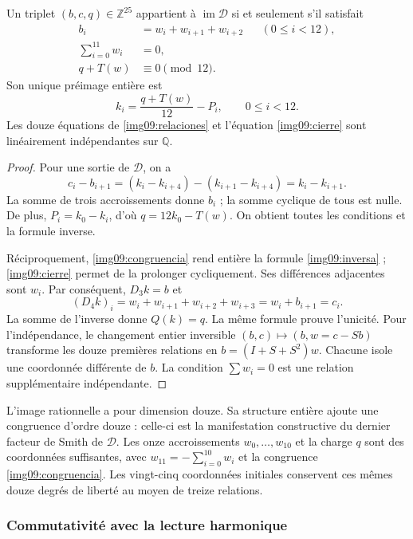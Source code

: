 \begin{theorem}
\label{img09:imagen}
Un triplet $(b,c,q)\in\mathbb Z^{25}$ appartient à
$\operatorname{im}\mathcal D$ si et seulement s'il satisfait
\begin{align}
 b_i&=w_i+w_{i+1}+w_{i+2}&& (0\leq i<12),
 \label{img09:relaciones}\\
 \sum_{i=0}^{11}w_i&=0,
 \label{img09:cierre}\\
 q+T(w)&\equiv0\pmod {12}.
 \label{img09:congruencia}
\end{align}
Son unique préimage entière est
\begin{equation}
 k_i=\frac{q+T(w)}{12}-P_i,\qquad0\leq i<12.
 \label{img09:inversa}
\end{equation}
Les douze équations de \eqref{img09:relaciones} et l'équation
\eqref{img09:cierre} sont linéairement indépendantes sur $\mathbb Q$.
\end{theorem}
\begin{proof}
Pour une sortie de $\mathcal D$, on a
\[
 c_i-b_{i+1}=(k_i-k_{i+4})-(k_{i+1}-k_{i+4})=k_i-k_{i+1}.
\]
La somme de trois accroissements donne $b_i$ ; la somme cyclique de tous
est nulle. De plus, $P_i=k_0-k_i$, d'où
$q=12k_0-T(w)$. On obtient toutes les conditions et la formule inverse.

Réciproquement, \eqref{img09:congruencia} rend entière la formule
\eqref{img09:inversa} ; \eqref{img09:cierre} permet de la prolonger
cycliquement. Ses différences adjacentes sont $w_i$. Par conséquent,
$D_3k=b$ et
\[
 (D_4k)_i=w_i+w_{i+1}+w_{i+2}+w_{i+3}
 =w_i+b_{i+1}=c_i.
\]
La somme de l'inverse donne $Q(k)=q$. La même formule prouve l'unicité.
Pour l'indépendance, le changement entier inversible
$(b,c)\mapsto(b,w=c-Sb)$ transforme les douze premières relations en
$b=(I+S+S^2)w$. Chacune isole une coordonnée différente de $b$.
La condition $\sum w_i=0$ est une relation supplémentaire indépendante.
\end{proof}

L'image rationnelle a pour dimension douze. Sa structure entière ajoute
une congruence d'ordre douze : celle-ci est la manifestation constructive du
dernier facteur de Smith de $\mathcal D$. Les onze accroissements
$w_0,\ldots,w_{10}$ et la charge $q$ sont des coordonnées suffisantes, avec
$w_{11}=-\sum_{i=0}^{10}w_i$ et la congruence
\eqref{img09:congruencia}. Les vingt-cinq coordonnées initiales
conservent ces mêmes douze degrés de liberté au moyen de treize relations.

\subsubsection{Commutativité avec la lecture harmonique}

